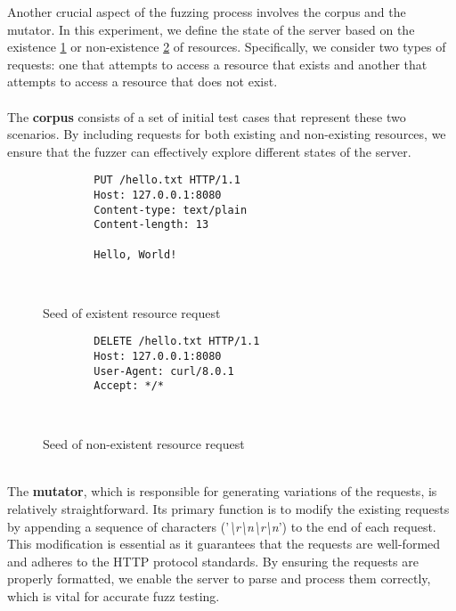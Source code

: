 Another crucial aspect of the fuzzing process involves the corpus and the mutator. In this experiment, we define the state of the server based on the existence \ref{tab:existent_resource} or non-existence \ref{tab:nonexistent_resource} of resources. Specifically, we consider two types of requests: one that attempts to access a resource that exists and another that attempts to access a resource that does not exist.
\\\\The \textbf{corpus} consists of a set of initial test cases that represent these two scenarios. By including requests for both existing and non-existing resources, we ensure that the fuzzer can effectively explore different states of the server.
\begin{figure}[H]
    \centering
    \begin{adjustbox}{valign=t}
    \begin{lstlisting}
        PUT /hello.txt HTTP/1.1
        Host: 127.0.0.1:8080
        Content-type: text/plain
        Content-length: 13
    
        Hello, World!

    
    \end{lstlisting}
    \end{adjustbox}
    \caption{Seed of existent resource request}
    \label{tab:existent_resource}
\end{figure}
    
\begin{figure}[H]
    \centering
    \begin{adjustbox}{valign=t}
    \begin{lstlisting}
        DELETE /hello.txt HTTP/1.1
        Host: 127.0.0.1:8080
        User-Agent: curl/8.0.1
        Accept: */*
    
    
    \end{lstlisting}
    \end{adjustbox}
    \caption{Seed of non-existent resource request}
    \label{tab:nonexistent_resource}
\end{figure}
\phantom{}\\
The \textbf{mutator}, which is responsible for generating variations of the requests, is relatively straightforward. Its primary function is to modify the existing requests by appending a sequence of characters ('\textit{\textbackslash r\textbackslash n\textbackslash r\textbackslash n}') to the end of each request. This modification is essential as it guarantees that the requests are well-formed and adheres to the HTTP protocol standards. By ensuring the requests are properly formatted, we enable the server to parse and process them correctly, which is vital for accurate fuzz testing.

